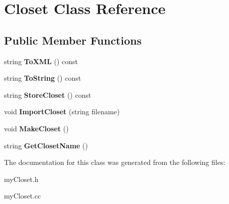\hypertarget{classCloset}{}\section{Closet Class Reference}
\label{classCloset}
\subsection*{Public Member Functions}
\begin{DoxyCompactItemize}
\item 
\mbox{\label{classCloset_a7642f749dfd4ad11a83c2cab5a3bdae2}} 
string {\bfseries To\+X\+ML} () const
\item 
\mbox{\label{classCloset_a3bad65dd75ada9a484eb7f78ebfa3b2a}} 
string {\bfseries To\+String} () const
\item 
\mbox{\label{classCloset_a1f2ec8e3e912756e35fdc55c9401ea3e}} 
string {\bfseries Store\+Closet} () const
\item 
\mbox{\label{classCloset_ac1057604430a855ca081cbfe16af10a5}} 
void {\bfseries Import\+Closet} (string filename)
\item 
\mbox{\label{classCloset_a1b904dfcdafe293f3f530b338afc0601}} 
void {\bfseries Make\+Closet} ()
\item 
\mbox{\label{classCloset_a108ab29dacfccd5d1c958d5ec88ad64f}} 
string {\bfseries Get\+Closet\+Name} ()
\end{DoxyCompactItemize}


The documentation for this class was generated from the following files\+:\begin{DoxyCompactItemize}
\item 
my\+Closet.\+h\item 
my\+Closet.\+cc\end{DoxyCompactItemize}
